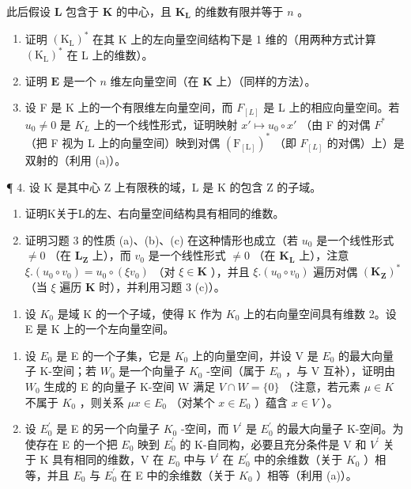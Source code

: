 此后假设 \(\mathbf{L}\) 包含于 \(\mathbf{K}\) 的中心，且 \(\mathbf{K}_{\mathbf{L}}\) 的维数有限并等于 \(n\) 。

\begin{enumerate}
\def\labelenumi{(\alph{enumi})}
\item
  证明 \((\mathrm{K}_{\mathrm{L}})^{*}\) 在其 K 上的左向量空间结构下是 1 维的（用两种方式计算 \((\mathrm{K}_{\mathrm{L}})^{*}\) 在 L 上的维数）。
\item
  证明 \(\mathbf{E}\) 是一个 \(n\) 维左向量空间（在 \(\mathbf{K}\) 上）（同样的方法）。
\item
  设 F 是 K 上的一个有限维左向量空间，而 \(F_{[L]}\) 是 L 上的相应向量空间。若 \(u_{0} \neq 0\) 是 \(K_{L}\) 上的一个线性形式，证明映射 \(x' \mapsto u_{0} \circ x'\) （由 F 的对偶 \(F^{*}\) （把 F 视为 L 上的向量空间）映到对偶 \((\mathrm{F}_{[\mathrm{L}]})^{*}\) （即 \(F_{[L]}\) 的对偶）上）是双射的（利用 (a)）。
\end{enumerate}

¶ 4. 设 K 是其中心 Z 上有限秩的域，L 是 K 的包含 Z 的子域。

\begin{enumerate}
\def\labelenumi{(\alph{enumi})}
\item
  证明K关于L的左、右向量空间结构具有相同的维数。
\item
  证明习题 3 的性质 (a)、(b)、(c) 在这种情形也成立（若 \(u_0\) 是一个线性形式 \(\neq 0\) （在 \(\mathbf{L}_{\mathbf{Z}}\) 上），而 \(v_0\) 是一个线性形式 \(\neq 0\) （在 \(\mathbf{K}_{\mathbf{L}}\) 上），注意 \(\xi. (u_0 \circ v_0) = u_0 \circ (\xi v_0)\) （对 \(\xi \in \mathbf{K}\) ），并且 \(\xi. (u_0 \circ v_0)\) 遍历对偶 \((\mathbf{K}_{\mathbf{Z}})^*\) （当 \(\xi\) 遍历 \(\mathbf{K}\) 时），并利用习题 3 (c)）。
\end{enumerate}

\begin{enumerate}
\def\labelenumi{\arabic{enumi}.}
\setcounter{enumi}{4}
\tightlist
\item
  设 \(K_{0}\) 是域 K 的一个子域，使得 K 作为 \(K_{0}\) 上的右向量空间具有维数 2。设 E 是 K 上的一个左向量空间。
\end{enumerate}

\begin{enumerate}
\def\labelenumi{(\alph{enumi})}
\item
  设 \(E_{0}\) 是 E 的一个子集，它是 \(K_{0}\) 上的向量空间，并设 V 是 \(E_{0}\) 的最大向量子 K-空间；若 \(W_{0}\) 是一个向量子 \(K_{0}\) -空间（属于 \(E_{0}\) ，与 V 互补），证明由 \(W_{0}\) 生成的 E 的向量子 K-空间 W 满足 \(V \cap W = \{0\}\) （注意，若元素 \(\mu \in K\) 不属于 \(K_{0}\) ，则关系 \(\mu x \in E_{0}\) （对某个 \(x \in E_{0}\) ）蕴含 \(x \in V\) ）。
\item
  设 \(E_{0}^{\prime}\) 是 E 的另一个向量子 \(K_{0}\) -空间，而 \(V^{\prime}\) 是 \(E_{0}^{\prime}\) 的最大向量子 K-空间。为使存在 E 的一个把 \(E_{0}\) 映到 \(E_{0}^{\prime}\) 的 K-自同构，必要且充分条件是 V 和 \(V^{\prime}\) 关于 K 具有相同的维数，V 在 \(E_{0}\) 中与 \(V^{\prime}\) 在 \(E_{0}^{\prime}\) 中的余维数（关于 \(K_{0}\) ）相等，并且 \(E_{0}\) 与 \(E_{0}^{\prime}\) 在 E 中的余维数（关于 \(K_{0}\) ）相等（利用 (a)）。
\end{enumerate}


